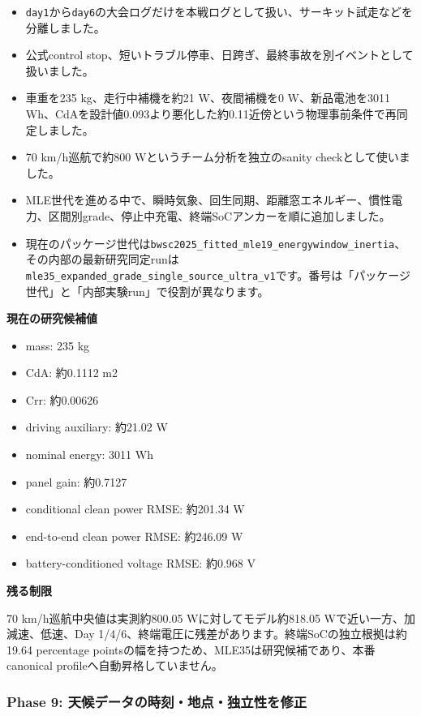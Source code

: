 \documentclass[
  japanese,
  a4paper,
  11pt]{article}
\providecommand{\tightlist}{%
  \setlength{\itemsep}{0pt}\setlength{\parskip}{0pt}}
\begin{document}
\begin{itemize}
\tightlist
\item
  \texttt{day1}から\texttt{day6}の大会ログだけを本戦ログとして扱い、サーキット試走などを分離しました。
\item
  公式control
  stop、短いトラブル停車、日跨ぎ、最終事故を別イベントとして扱いました。
\item
  車重を235 kg、走行中補機を約21 W、夜間補機を0 W、新品電池を3011
  Wh、CdAを設計値0.093より悪化した約0.11近傍という物理事前条件で再同定しました。
\item
  70 km/h巡航で約800 Wというチーム分析を独立のsanity
  checkとして使いました。
\item
  MLE世代を進める中で、瞬時気象、回生同期、距離窓エネルギー、慣性電力、区間別grade、停止中充電、終端SoCアンカーを順に追加しました。
\item
  現在のパッケージ世代は\texttt{bwsc2025\_fitted\_mle19\_energywindow\_inertia}、その内部の最新研究同定runは\texttt{mle35\_expanded\_grade\_single\_source\_ultra\_v1}です。番号は「パッケージ世代」と「内部実験run」で役割が異なります。
\end{itemize}

\textbf{現在の研究候補値}

\begin{itemize}
\tightlist
\item
  mass: 235 kg
\item
  CdA: 約0.1112 m2
\item
  Crr: 約0.00626
\item
  driving auxiliary: 約21.02 W
\item
  nominal energy: 3011 Wh
\item
  panel gain: 約0.7127
\item
  conditional clean power RMSE: 約201.34 W
\item
  end-to-end clean power RMSE: 約246.09 W
\item
  battery-conditioned voltage RMSE: 約0.968 V
\end{itemize}

\textbf{残る制限}

70 km/h巡航中央値は実測約800.05 Wに対してモデル約818.05
Wで近い一方、加減速、低速、Day
1/4/6、終端電圧に残差があります。終端SoCの独立根拠は約19.64 percentage
pointsの幅を持つため、MLE35は研究候補であり、本番canonical
profileへ自動昇格していません。

\subsubsection{Phase 9:
天候データの時刻・地点・独立性を修正}\label{phase-9-ux5929ux5019ux30c7ux30fcux30bfux306eux6642ux523bux5730ux70b9ux72ecux7acbux6027ux3092ux4feeux6b63}
\end{document}
